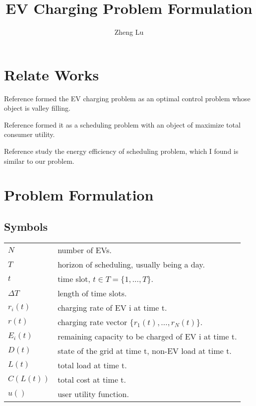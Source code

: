 \documentclass {article}
\begin{document}
\title {EV Charging Problem Formulation}
\author {Zheng Lu}
\maketitle

\section {Relate Works}
Reference \cite{Valley Filling} formed the EV charging problem as an optimal control problem whose object is valley filling.

Reference \cite{Aggregate Utility} formed it as a scheduling problem with an object of maximize total consumer utility.

Reference \cite{EE Scheduling} study the energy efficiency of scheduling problem, which I found is similar to our problem.

\section {Problem Formulation}
\subsection {Symbols}
\begin {tabular} { l l }
$N$ & number of EVs. \\
$T$ & horizon of scheduling, usually being a day. \\
$t$ & time slot, $t \in T = \{ 1, \ldots ,T \}$. \\
$\Delta T$ & length of time slots. \\
$r_i(t)$ & charging rate of EV i at time t. \\
$r(t)$ & charging rate vector $\{ r_1(t), \ldots , r_N(t) \}$. \\
$E_i(t)$ & remaining capacity to be charged of EV i at time t. \\
$D(t)$ & state of the grid at time t, non-EV load at time t. \\
$L(t)$ & total load at time t. \\
$C(L(t))$ & total cost at time t. \\
$u()$ & user utility function. \\
\end{tabular}

%
\end{document}
